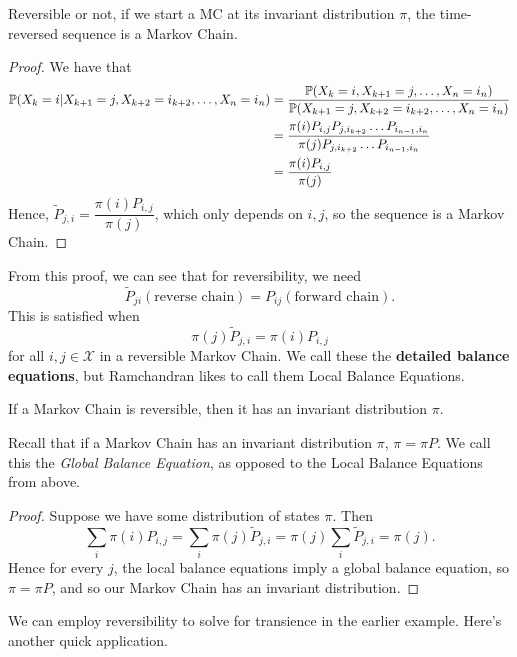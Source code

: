 \documentclass[11 pt]{scrartcl}
\begin{document}
\begin{fact}
    Reversible or not, if we start a MC at its invariant distribution $\pi$, the time-reversed sequence is a Markov Chain.  
\end{fact}
\begin{proof}
    We have that 
    \begin{align*}
        \mathbb P(X_k = i | X_{k+1} = j, X_{k+2} = i_{k+2}, \dots, X_n = i_n) &= \dfrac{\mathbb P(X_k = i, X_{k+1} = j, \dots, X_n = i_n)}{\mathbb P(X_{k+1} = j, X_{k+2} = i_{k+2}, \dots, X_n = i_n)}  \\
        &= \dfrac{\pi(i) P_{i,j}P_{j, i_{k+2}} \dots P_{i_{n-1},i_n}}{\pi(j) P_{j, i_{k+2} } \dots P_{i_{n-1}, i_n}} \\ 
        &= \dfrac{\pi(i) P_{i,j}}{\pi(j)}
    \end{align*}
    Hence, $\tilde{P}_{j,i} = \dfrac{\pi(i) P_{i,j}}{\pi(j)}$, which only depends on $i,j$, so the sequence is a Markov Chain. 
\end{proof}

From this proof, we can see that for reversibility, we need 
\[ \tilde{P}_{ji}(\text{reverse chain})= P_{ij}(\text{forward chain}).\]
This is satisfied when 
    \[ \pi(j) \tilde{P}_{j,i} = \pi(i) P_{i,j}\]
    for all $i,j\in \mathcal{X}$ in a reversible Markov Chain. We call these the \textbf{detailed balance equations}, but Ramchandran likes to call them Local Balance Equations. 

\begin{theorem}
    If a Markov Chain is reversible, then it has an invariant distribution $\pi$. 
\end{theorem}

Recall that if a Markov Chain has an invariant distribution $\pi$, $\pi = \pi P$. We call this the \emph{Global Balance Equation}, as opposed to the Local Balance Equations from above. 

\begin{proof}
    Suppose we have some distribution of states $\pi$. Then 
    \[ \sum_i \pi(i) P_{i,j} = \sum_i \pi(j) \tilde{P}_{j,i} = \pi(j) \sum_{i} \tilde{P}_{j,i} = \pi(j).\] 
    Hence for every $j$, the local balance equations imply a global balance equation,  so $\pi = \pi P$, and so our Markov Chain has an invariant distribution. 
\end{proof}

We can employ reversibility to solve for transience in the earlier example. Here's another quick application. 
\end{document}
